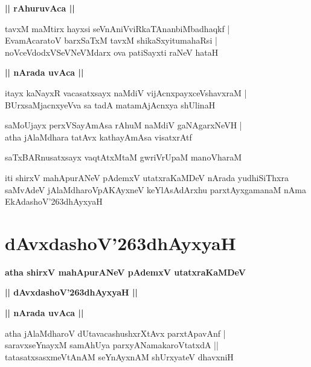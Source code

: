 \documentclass[twoside,12pt,openright]{book}
\def\S{\char'263}
\newcounter{shloka}[chapter]
\def\uvaca#1{\centerline{{\large\textbf{#1}}}}
\begin{document}
\uvaca{|| rAhuruvAca ||}

\begin{shloka}%
tavxM  maMtirx hayxsi seVnAniVviRkaTAnanbiMbadhaqkf |\\
EvamAcaratoV barxSaTxM tavxM  shikaSxyitumahaRsi |\\
noVceVdodxVSeVNeVMdarx ova patiSayxti raNeV hataH 
\end{shloka}

\uvaca{|| nArada uvAca ||}

\begin{shloka}%
itayx kaNayxR vacasatxsayx naMdiV vijAcnxpayxceVshavxraM |\\
BUrxsaMjacnxyeVva sa tadA matamAjAcnxya shUlinaH 
\end{shloka}

\begin{shloka}%
saMoUjayx perxVSayAmAsa rAhuM naMdiV gaNAgarxNeVH |\\
atha jAlaMdhara tatAvx kathayAmAsa visatxrAtf 
\end{shloka}

\begin{shloka}%
saTxBARnusatxsayx vaqtAtxMtaM gwriVrUpaM manoVharaM 
\end{shloka}

\begin{center}
iti shirxV mahApurANeV pAdemxV utatxraKaMDeV  nArada yudhiSiThxra saMvAdeV jAlaMdharoVpAKAyxneV keYlAsAdArxhu 
parxtAyxgamanaM nAma EkAdashoV\S dhAyxyaH 
\end{center}

\chapter{dAvxdashoV\S dhAyxyaH}

\begin{center}
{\LARGE\bfseries atha shirxV mahApurANeV pAdemxV utatxraKaMDeV} 
\end{center}

\begin{center}
{\LARGE\bfseries  || dAvxdashoV\S dhAyxyaH ||}
\end{center}

\uvaca{|| nArada uvAca ||}

\begin{shloka}%
atha jAlaMdharoV dUtavacashushxrXtAvx parxtApavAnf |\\
saravxseYnayxM samAhUya parxyANamakaroVtatxdA ||\\
tatasatxsasxmeVtAnAM seYnAyxnAM shUrxyateV dhavxniH 
\end{shloka}
\end{document}
